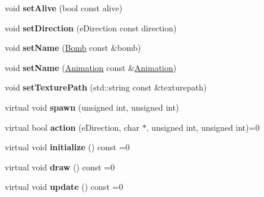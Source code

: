 \begin{DoxyCompactItemize}
\item 
\hypertarget{class_a_character_a481b8ffa2142f06d507cebe2ac134329}{}void {\bfseries set\+Alive} (bool const alive)\label{class_a_character_a481b8ffa2142f06d507cebe2ac134329}

\item 
\hypertarget{class_a_character_a71305fc607d81ec4798e6281bbcdd29d}{}void {\bfseries set\+Direction} (e\+Direction const direction)\label{class_a_character_a71305fc607d81ec4798e6281bbcdd29d}

\item 
\hypertarget{class_a_character_aa437a9ea006c96642a898ca919bc4d38}{}void {\bfseries set\+Name} (\hyperlink{class_bomb}{Bomb} const \&bomb)\label{class_a_character_aa437a9ea006c96642a898ca919bc4d38}

\item 
\hypertarget{class_a_character_a5d89b2c91116030ce2feb7bda61ffa7c}{}void {\bfseries set\+Name} (\hyperlink{class_animation}{Animation} const \&\hyperlink{class_animation}{Animation})\label{class_a_character_a5d89b2c91116030ce2feb7bda61ffa7c}

\item 
\hypertarget{class_a_character_aa63c0b50e06ce547f0f530f7c1dcbeeb}{}void {\bfseries set\+Texture\+Path} (std\+::string const \&texturepath)\label{class_a_character_aa63c0b50e06ce547f0f530f7c1dcbeeb}

\item 
\hypertarget{class_a_character_a80552fb56c7f548d6283774a874bf40b}{}virtual void {\bfseries spawn} (unsigned int, unsigned int)\label{class_a_character_a80552fb56c7f548d6283774a874bf40b}

\item 
\hypertarget{class_a_character_ab984a668da32a96a29b313815e4b5e07}{}virtual bool {\bfseries action} (e\+Direction, char $\ast$, unsigned int, unsigned int)=0\label{class_a_character_ab984a668da32a96a29b313815e4b5e07}

\item 
\hypertarget{class_a_character_a26a26293f933e7abb46dc0527e911e99}{}virtual void {\bfseries initialize} () const =0\label{class_a_character_a26a26293f933e7abb46dc0527e911e99}

\item 
\hypertarget{class_a_character_a8fe2c1e3df13fd3b36ba22d9dc7baea7}{}virtual void {\bfseries draw} () const =0\label{class_a_character_a8fe2c1e3df13fd3b36ba22d9dc7baea7}

\item 
\hypertarget{class_a_character_af075823ce6cb8466028fc67443363f3e}{}virtual void {\bfseries update} () const =0\label{class_a_character_af075823ce6cb8466028fc67443363f3e}

\end{DoxyCompactItemize}
